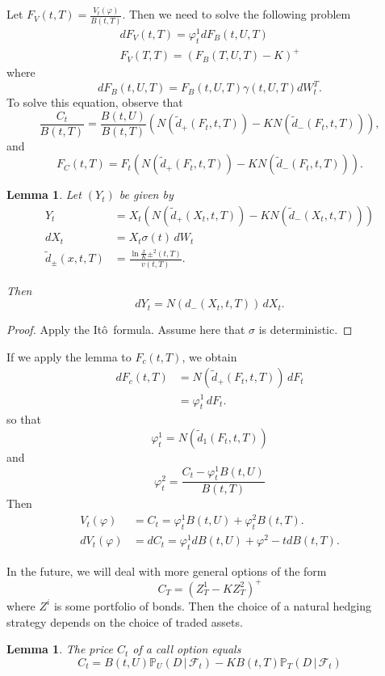 \documentclass[10pt, oneside, reqno]{amsbook}
\theoremstyle{plain}%
\newtheorem{lem}[thm]{Lemma}
\theoremstyle{definition}
\theoremstyle{remark}
\newcommand{\given}{ \, | \,}
\renewcommand{\phi}{\varphi}
\newcommand{\sigf}{\mathcal{F}}
\renewcommand{\P}{\mathbb{P}}
\newcommand{\ito}{It\^o\ }
\numberwithin{equation}{chapter}
\begin{document}
	Let $F_V(t, T) = \frac{V_t(\phi)}{B(t, T)}$.  Then we need to solve the following problem \begin{align*}
		dF_V(t, T) = \phi_t^1 d F_B(t, U, T) \\
		F_V(T, T) = (F_B(T, U, T) - K)^+
	\end{align*} where \[
		dF_B(t, U, T) = F_B(t, U, T) \gamma(t, U, T) dW^T_t.
	\]  To solve this equation, observe that \[
		\frac{C_t}{B(t, T)} = \frac{B(t, U)}{B(t, T)}\left( N( \tilde d_+ (F_t, t, T)) - K N (\tilde d_-(F_t, t, T)) \right), 		
	\] and \[
		F_C(t, T) = F_t \left( N( \tilde d_+ (F_t, t, T)) - K N (\tilde d_-(F_t, t, T)) \right).
	\]

\begin{lem}
	Let $(Y_t)$ be given by \begin{align*}
		Y_t &= X_t \left( N( \tilde d_+ (X_t, t, T)) - K N (\tilde d_-(X_t, t, T)) \right) \\
		dX_t &= X_t \sigma(t) \, dW_t \\
		\tilde d_{\pm}(x, t, T) &= \frac{ \ln \frac{x}{K} \pm ^2(t, T)}{v(t, T)}. 
	\end{align*}
	
	Then \[
		dY_t = N(d_{-}(X_t, t, T)) \, dX_t.
	\]
\end{lem}

\begin{proof}
	Apply the \ito formula.  Assume here that $\sigma$ is deterministic. 
\end{proof}

 If we apply the lemma to $F_c(t, T)$, we obtain \begin{align*}
	dF_c(t, T) &= N(\tilde d_+(F_t, t, T)) \, dF_t \\
				&= \phi^1_t \, dF_t.
\end{align*} so that \[
	\phi^1_t = N(\tilde d_1(F_t, t, T))
\] and \[
	\phi^2_t = \frac{C_t - \phi^1_t B(t, U)}{B(t, T)}
\] Then \begin{align*}
	V_t(\phi) 	&= C_t = \phi^1_tB(t, U) + \phi^2_t B(t, T). \\
	dV_t(\phi) 	&= dC_t = \phi^1_t dB(t, U) + \phi^2-t dB(t, T).
\end{align*}

In the future, we will deal with more general options of the form \[
	C_T = (Z^1_T - K Z^2_T)^+
\]  where $Z^i$ is some portfolio of bonds.  Then the choice of a natural hedging strategy depends on the choice of traded assets.  

\begin{lem}
	The price $C_t$ of a call option equals \[
		C_t = B(t, U) \P_U(D \given \sigf_t) - K B(t, T) \P_T(D \given \sigf_t)
	\]
\end{lem}
\end{document}
